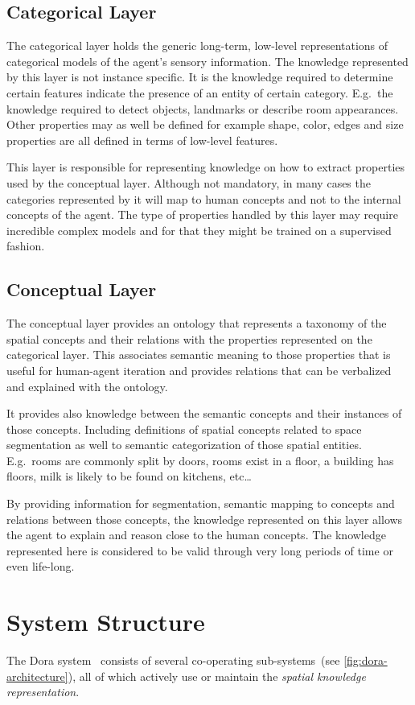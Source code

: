 \subsection{Categorical Layer}
The categorical layer holds the generic long-term, low-level representations of categorical models
of the agent's sensory information.
The knowledge represented by this layer is not instance specific. It is the knowledge
required to determine certain features indicate the presence of an entity of certain
category. E.g.\ the knowledge required to detect objects, landmarks or describe room appearances.
Other properties may as well be defined for example shape, color, edges and size properties
are all defined in terms of low\hyp{}level features.

This layer is responsible for representing knowledge on how to extract properties used
by the conceptual layer.
Although not mandatory, in many cases the categories represented by it will map to human concepts
and not to the internal concepts of the agent.
The type of properties handled by this layer may require incredible complex models and for
that they might be trained on a supervised fashion.

\subsection{Conceptual Layer}
The conceptual layer provides an ontology that represents a taxonomy of the spatial concepts
and their relations with the properties represented on the categorical layer.
This associates semantic meaning to those properties that is useful for human-agent iteration
and provides relations that can be verbalized and explained with the ontology.

It provides also knowledge between the semantic concepts and their instances of those concepts.
Including definitions of spatial concepts related to space segmentation as well to semantic
categorization of those spatial entities.
E.g.\ rooms are commonly split by doors, rooms exist in a floor, a building has floors, milk is
likely to be found on kitchens, etc\dots

By providing information for segmentation, semantic mapping to concepts and relations between those
concepts, the knowledge represented on this layer allows the agent to explain and reason close to
the human concepts. The knowledge represented here is considered to be valid through very long
periods of time or even life\hyp{}long.


\section{System Structure}
The \Gls{Dora} system~\cite{hanheide2011ijcai} consists of several co-operating
sub-systems~(see \autoref{fig:dora-architecture}),
all of which actively use or maintain the \emph{spatial knowledge representation}.

